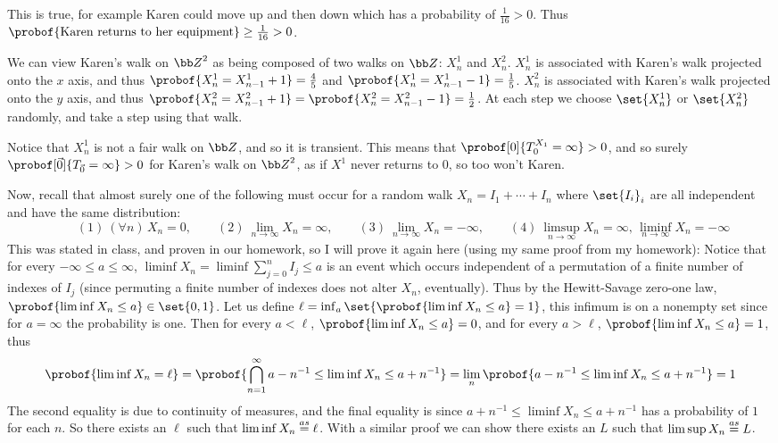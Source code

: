 \eexerc

\benum
    \item This is true, for example Karen could move up and then down which has a probability of $\frac1{16}>0$.
    Thus $\probof{\hbox{Karen returns to her equipment}}\geq\frac1{16}>0$.
    \item We can view Karen's walk on ${\bb Z}^2$ as being composed of two walks on ${\bb Z}$: $X^1_n$ and $X^2_n$.
    $X^1_n$ is associated with Karen's walk projected onto the $x$ axis, and thus $\probof{X^1_n=X^1_{n-1}+1}=\frac45$ and $\probof{X^1_n=X^1_{n-1}-1}=\frac15$.
    $X^2_n$ is associated with Karen's walk projected onto the $y$ axis, and thus $\probof{X^2_n=X^2_{n-1}+1}=\probof{X^2_n=X^2_{n-1}-1}=\frac12$.
    At each step we choose $\set{X^1_n}$ or $\set{X^2_n}$ randomly, and take a step using that walk.

    Notice that $X^1_n$ is not a fair walk on ${\bb Z}$, and so it is transient.
    This means that $\probof[0]{T_0^{X_1}=\infty}>0$, and so surely $\probof[\vec 0]{T_{\vec 0}=\infty}>0$ for Karen's walk on ${\bb Z}^2$, as if $X^1$ never returns to $0$, so too won't Karen.
    \item Now, recall that almost surely one of the following must occur for a random walk $X_n=I_1+\cdots+I_n$ where $\set{I_i}_i$ are all independent and have the same distribution:
    $$\qquad (1)\ (\forall n)\,X_n=0,\qquad (2)\ \lim_{n\to\infty}X_n=\infty,\qquad (3)\ \lim_{n\to\infty}X_n=-\infty,\qquad (4)\ \limsup_{n\to\infty}X_n=\infty,\,\liminf_{n\to\infty}X_n=-\infty $$
    This was stated in class, and proven in our homework, so I will prove it again here (using my same proof from my homework):
    Notice that for every $-\infty\leq a\leq\infty$, $\liminf X_n=\liminf\sum_{j=0}^nI_j\leq a$ is an event which occurs independent of a permutation of a finite number of indexes of $I_j$ (since permuting
    a finite number of indexes does not alter $X_n$, eventually).
    Thus by the Hewitt-Savage zero-one law, $\probof{\liminf X_n\leq a}\in\set{0,1}$.
    Let us define $\ell=\inf_a\set{\probof{\liminf X_n\leq a}=1}$, this infimum is on a nonempty set since for $a=\infty$ the probability is one.
    Then for every $a<\ell$, $\probof{\liminf X_n\leq a}=0$, and for every $a>\ell$, $\probof{\liminf X_n\leq a}=1$, thus
    $$ \probof{\liminf X_n=\ell} = \probof{\bigcap_{n=1}^\infty a-n^{-1}\leq\liminf X_n\leq a+n^{-1}} = \lim_n\probof{a-n^{-1}\leq\liminf X_n\leq a+n^{-1}} = 1 $$
    The second equality is due to continuity of measures, and the final equality is since $a+n^{-1}\leq\liminf X_n\leq a+n^{-1}$ has a probability of $1$ for each $n$.
    So there exists an $\ell$ such that $\liminf X_n\buildrel as\over=\ell$.
    With a similar proof we can show there exists an $L$ such that $\limsup X_n\buildrel as\over=L$.
    
